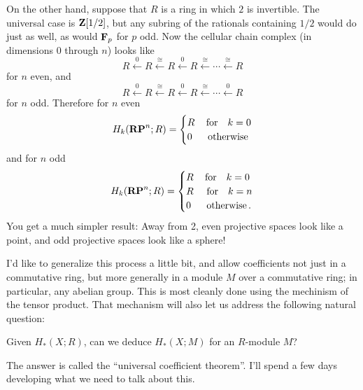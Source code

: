 On the other hand, suppose that $R$ is a ring in which $2$ is invertible.
The universal case is $\mathbf Z[1/2]$, but any subring of the rationals containing
$1/2$ would do just as well, as would $\mathbf F_p$ for $p$ odd. 
Now the cellular chain complex (in dimensions 0 through $n$)
looks like
\[
R\xleftarrow{0}R\xleftarrow{\cong}R\xleftarrow{0}R
\xleftarrow{\cong}\cdots\xleftarrow{\cong}R
\]
for $n$ even, and
\[
R\xleftarrow{0}R\xleftarrow{\cong}R\xleftarrow{0}R
\xleftarrow{\cong}\cdots\xleftarrow{0}R
\]
for $n$ odd. Therefore for $n$ even
\[
H_k(\mathbf{RP}^n;R)=
\begin{cases}R\,&\hbox{for}\quad k=0\\0\,&\,\hbox{otherwise}\end{cases}
\]
and for $n$ odd
\[
H_k(\mathbf{RP}^n;R)=
\begin{cases}R\,&\hbox{for}\quad k=0\\
R\,&\,\hbox{for}\quad k=n\\
0\,&\,\hbox{otherwise}\,.
\end{cases}
\]
You get a much simpler result: Away from 2, even projective spaces look like a point, and odd projective spaces look like a sphere!

I'd like to generalize this process a little bit, and allow coefficients 
not just in
a commutative ring, but more generally in a module $M$ over a commutative ring;
in particular, any abelian group. This is most cleanly done using the
mechinism of the tensor product. That mechanism will also let us address
the following natural question: 
\begin{question}
Given $H_*(X;R)$, can we deduce $H_*(X;M)$ for an $R$-module $M$?
\end{question}
The answer is called the ``universal coefficient theorem''. I'll spend a few days developing what we need to talk about this.



